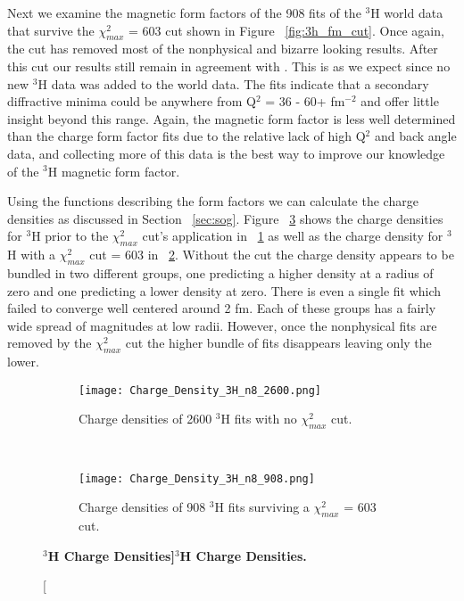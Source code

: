 Next we examine the magnetic form factors of the 908 fits of the $^3$H world data that survive the $\chi^2_{max}$ = 603 cut shown in Figure ~\ref{fig:3h_fm_cut}. Once again, the cut has removed most of the nonphysical and bizarre looking results. After this cut our results still remain in agreement with \cite{Article:Amroun}. This is as we expect since no new $^3$H data was added to the world data. The fits indicate that a secondary diffractive minima could be anywhere from Q$^2$ = 36 - 60+ fm$^{-2}$ and offer little insight beyond this range. Again, the magnetic form factor is less well determined than the charge form factor fits due to the relative lack of high Q$^2$ and back angle data, and collecting more of this data is the best way to improve our knowledge of the $^3$H magnetic form factor. 

Using the functions describing the form factors we can calculate the charge densities as discussed in Section ~\ref{sec:sog}. Figure ~\ref{fig:3h_charge_density} shows the charge densities for $^3$H prior to the $\chi^2_{max}$ cut's application in ~\ref{fig:3h_charge_density_no_cut} as well as the charge density for $^3$H with a $\chi^2_{max}$ cut = 603 in ~\ref{fig:3h_charge_density_cut}. Without the cut the charge density appears to be bundled in two different groups, one predicting a higher density at a radius of zero and one predicting a lower density at zero. There is even a single fit which failed to converge well centered around 2 fm. Each of these groups has a fairly wide spread of magnitudes at low radii. However, once the nonphysical fits are removed by the $\chi^2_{max}$ cut the higher bundle of fits disappears leaving only the lower. 

\begin{figure}[!ht]
\begin{subfigure}{1.\textwidth}
  \centering
  \texttt{[image: Charge\_Density\_3H\_n8\_2600.png]}
  \caption{Charge densities of 2600 $^3$H fits with no $\chi^2_{max}$ cut.}
  \label{fig:3h_charge_density_no_cut}
\end{subfigure}\\
\begin{subfigure}{1.\textwidth}
  \centering
  \texttt{[image: Charge\_Density\_3H\_n8\_908.png]}
  \caption{Charge densities of 908 $^3$H fits surviving a $\chi^2_{max}$ = 603 cut.}
  \label{fig:3h_charge_density_cut}
\end{subfigure}
\caption[\bf{$^3$H Charge Densities}]{\bf{$^3$H Charge Densities.}}
\label{fig:3h_charge_density}
\end{figure}

